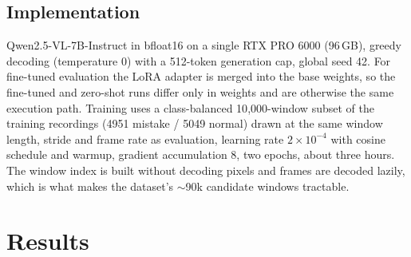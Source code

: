 \documentclass[10pt,twocolumn]{article}
\begin{document}
\subsection{Implementation}
Qwen2.5-VL-7B-Instruct in bfloat16 on a single RTX PRO 6000 (96\,GB), greedy
decoding (temperature 0) with a 512-token generation cap, global seed 42. For
fine-tuned evaluation the LoRA adapter is merged into the base weights, so the
fine-tuned and zero-shot runs differ only in weights and are otherwise the same
execution path. Training uses a class-balanced 10{,}000-window subset of the
training recordings (4951 mistake / 5049 normal) drawn at the same window length,
stride and frame rate as evaluation, learning rate $2\!\times\!10^{-4}$ with
cosine schedule and warmup, gradient accumulation 8, two epochs, about three
hours. The window index is built without decoding pixels and frames are decoded
lazily, which is what makes the dataset's $\sim$90k candidate windows tractable.

\section{Results}
\label{sec:results}

\begin{table}[!t]
\centering\footnotesize
\setlength{\tabcolsep}{3.5pt}
\caption{Online causal detection on the \textbf{complete} CaptainCook4D test
split: all \resClips{} recordings, \resWindows{} windows, no subsetting. Each arm
uses its own decision layer selected on validation and applied to test once.
Brackets are 95\% clip-level bootstrap intervals (1000 resamples, seed 0).
macro F1$^{-}$ excludes the structurally unreachable \texttt{missing\_step}
class. AUC is computed on raw ungated scores and is therefore threshold-free.
The trivial row fires on every window; read every F1 against it.
ECE is reported for every row because the decision-token score is informative but
uncalibrated (Section~\ref{sec:confidence}); lower is better, and the baseline is
the best-calibrated row. Binary F1 and the localisation columns use different
firing rules by design (Section~\ref{sec:decision}).}
\label{tab:main}
\end{table}
\end{document}
